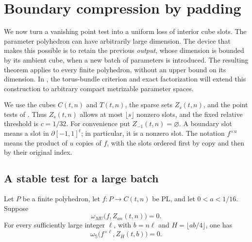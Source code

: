 \section{Boundary compression by padding}
\label{sec:compression-cobordism}

We now turn a vanishing point test into a uniform loss of interior cube
slots.  The parameter polyhedron can have arbitrarily large dimension.
The device that makes this possible is to retain the previous
\emph{output}, whose dimension is bounded by its ambient cube, when a
new batch of parameters is introduced.  The resulting theorem applies to every finite polyhedron, without
an upper bound on its dimension.  In ,
the torus-bundle criterion and exact factorization will extend this
construction to arbitrary compact metrizable parameter spaces.

We use the cubes $C(t,n)$ and $T(t,n)$, the sparse sets $Z_s(t,n)$, and
the point tests of .  Thus $Z_s(t,n)$ allows at most
$\lfloor s\rfloor$ nonzero slots, and the fixed relative threshold is
$c=1/32$.  For convenience put $Z_{-1}(t,n)=\varnothing$.  A boundary
slot means a slot in $\partial[-1,1]^t$; in particular, it is a nonzero
slot.  The notation $f^{\times u}$ means the product of $u$ copies of
$f$, with the slots ordered first by copy and then by their original
index.

\subsection{A stable test for a large batch}

\begin{lemma}
\label{lem:batch-vanishing}
Let $P$ be a finite polyhedron, let $f:P\to C(t,n)$ be PL, and let
$0<a<1/16$.  Suppose
\[
 \omega_{MU}\bigl(f,Z_{an}(t,n)\bigr)=0.
\]
For every sufficiently large integer $\ell$, with $b=n\ell$ and
$H=\lfloor ab/4\rfloor$, one has
\[
 \omega_{\mathbb S}\bigl(f^{\times\ell},Z_H(t,b)\bigr)=0.
\]
\end{lemma}

